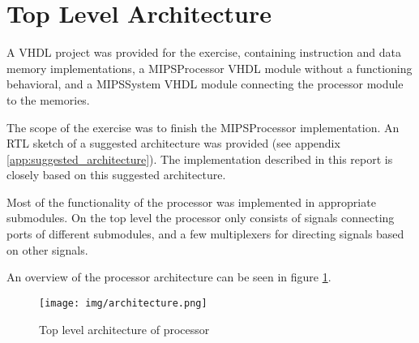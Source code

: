 \section{Top Level Architecture}
A VHDL project was provided for the exercise,
containing instruction and data memory implementations,
a MIPSProcessor VHDL module without a functioning behavioral,
and a MIPSSystem VHDL module connecting the processor module to the memories.

The scope of the exercise was to finish the MIPSProcessor implementation.
An RTL sketch of a suggested architecture was provided (see appendix \ref{app:suggested_architecture}).
The implementation described in this report is closely based on this suggested architecture.

Most of the functionality of the processor was implemented in appropriate submodules.
On the top level the processor only consists of signals connecting ports of different submodules,
and a few multiplexers for directing signals based on other signals.

An overview of the processor architecture can be seen in figure \ref{fig:architecture}.

\begin{figure}[p]
    \centering
    \texttt{[image: img/architecture.png]}
    \caption{Top level architecture of processor}
    \label{fig:architecture}
\end{figure}


